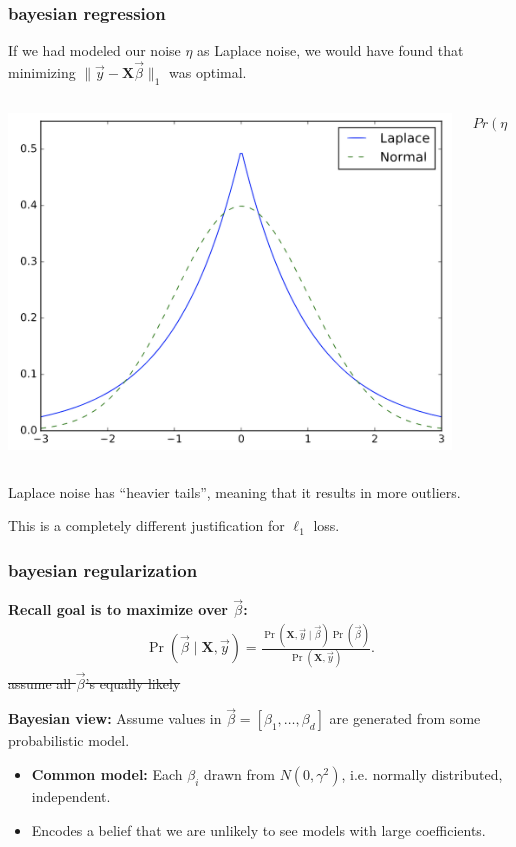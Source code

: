 \documentclass[handout,compress]{beamer}
\newcommand{\bv}[1]{\mathbf{#1}}
\begin{document}
\begin{frame}
	\frametitle{bayesian regression}
		If we had modeled our noise $\eta$ as Laplace noise, we would have found that minimizing $\|\vec{y} - \bv{X}\vec{\beta}\|_1$ was optimal.
		
		\vspace{1em}
		\begin{columns}
			\begin{column}{.5\textwidth}
				\hspace{2em}\includegraphics[width=.9\textwidth]{laplacen.png}
			\end{column}
			\begin{column}{.5\textwidth}
				$Pr(\eta = z) \sim$
			\end{column}
		\end{columns}
	
	Laplace noise has ``heavier tails'', meaning that it results in more outliers.
	
	\alert{This is a completely different justification for $\ell_1$ loss.}
\end{frame}

\begin{frame}
	\frametitle{bayesian regularization}
	\begin{center}
	\textbf{Recall goal is to maximize over $\vec{\beta}$:}
	\begin{align*}
		\Pr(\vec{\beta} \mid \bv{X},\vec{y} )  = \frac{\Pr(\bv{X},\vec{y} \mid  \vec{\beta} ) \Pr(\vec{\beta} )  }{\Pr(\bv{X},\vec{y} )}.
	\end{align*}
	\sout{assume all $\vec{\beta}$'s equally likely}	
	
	\textbf{Bayesian view:} Assume values in $\vec{\beta} = [\beta_1, \ldots, \beta_d]$ are generated from some probabilistic model. 
	\end{center}

\begin{itemize}
	\item \textbf{Common model:} Each $\beta_i$ drawn from $N(0,\gamma^2)$, i.e. normally distributed, independent.
	\item Encodes a belief that we are unlikely to see models with large coefficients. 
\end{itemize}
\end{frame}
\end{document}
